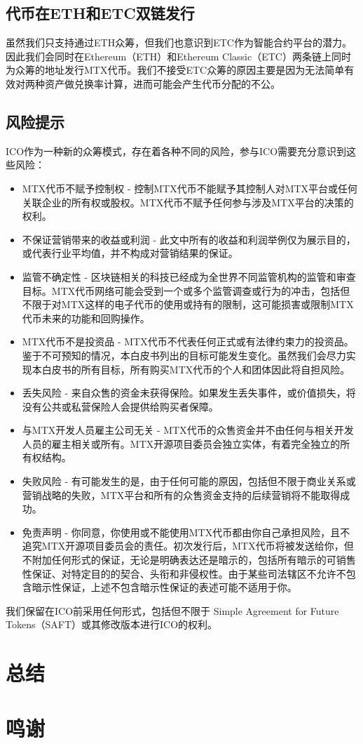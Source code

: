 \documentclass[UTF8,nofonts]{ctexart}
\begin{document}
\subsection{代币在ETH和ETC双链发行\label{sec:chains}}

虽然我们只支持通过ETH众筹，但我们也意识到ETC作为智能合约平台的潜力。因此我们会同时在Ethereum（ETH）和Ethereum Classic（ETC）两条链上同时为众筹的地址发行MTX代币。我们不接受ETC众筹的原因主要是因为无法简单有效对两种资产做兑换率计算，进而可能会产生代币分配的不公。


\subsection{风险提示\label{sec:risks}}

ICO作为一种新的众筹模式，存在着各种不同的风险，参与ICO需要充分意识到这些风险：
\begin{itemize}
	\item MTX代币不赋予控制权 - 控制MTX代币不能赋予其控制人对MTX平台或任何关联企业的所有权或股权。MTX代币不赋予任何参与涉及MTX平台的决策的权利。
	\item 不保证营销带来的收益或利润 - 此文中所有的收益和利润举例仅为展示目的，或代表行业平均值，并不构成对营销结果的保证。
	\item 监管不确定性 - 区块链相关的科技已经成为全世界不同监管机构的监管和审查目标。MTX代币网络可能会受到一个或多个监管调查或行为的冲击，包括但不限于对MTX这样的电子代币的使用或持有的限制，这可能损害或限制MTX代币未来的功能和回购操作。
	\item MTX代币不是投资品 - MTX代币不代表任何正式或有法律约束力的投资品。鉴于不可预知的情况，本白皮书列出的目标可能发生变化。虽然我们会尽力实现本白皮书的所有目标，所有购买MTX代币的个人和团体因此将自担风险。
	\item 丢失风险 - 来自众售的资金未获得保险。如果发生丢失事件，或价值损失，将没有公共或私营保险人会提供给购买者保障。
	\item 与MTX开发人员雇主公司无关 - MTX代币的众售资金并不由任何与相关开发人员的雇主相关或所有。MTX开源项目委员会独立实体，有着完全独立的所有权结构。
	\item 失败风险 - 有可能发生的是，由于任何可能的原因，包括但不限于商业关系或营销战略的失败，MTX平台和所有的众售资金支持的后续营销将不能取得成功。
	\item 免责声明 - 你同意，你使用或不能使用MTX代币都由你自己承担风险，且不追究MTX开源项目委员会的责任。初次发行后，MTX代币将被发送给你，但不附加任何形式的保证，无论是明确表达还是暗示的，包括所有暗示的可销售性保证、对特定目的的契合、头衔和非侵权性。由于某些司法辖区不允许不包含暗示性保证，上述不包含暗示性保证的表述可能不适用于你。
\end{itemize}


我们保留在ICO前采用任何形式，包括但不限于 Simple Agreement for Future Tokens（SAFT）或其修改版本进行ICO的权利。

\section{总结\label{sec:summary}}

\section{鸣谢\label{sec:acknowledgement}}

\newpage


\end{document}
